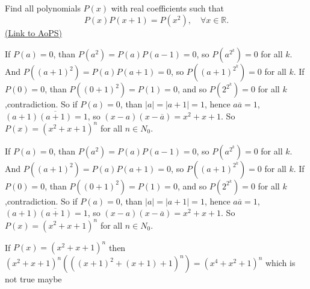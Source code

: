 \begin{problem}
	Find all polynomials $P(x)$ with real coefficients such that
\[P(x)P(x + 1) = P(x^2), \quad \forall x \in \mathbb R.\]
	\flushright \href{https://artofproblemsolving.com/community/c6h395325}{(Link to AoPS)}
\end{problem}



\begin{solution}
	If $P(a)=0$, than $P(a^2)=P(a)P(a-1)=0$, so $P(a^{2^k})=0$ for all $k$. And  $P((a+1)^2)=P(a)P(a+1)=0$, so $P((a+1)^{2^k})=0$ for all $k$.
If $P(0)=0$, than $P((0+1)^2)=P(1)=0$, and so $P(2^{2^k})=0$ for all $k$,contradiction.
So if $P(a)=0$, than $\left|a\right|=\left|a+1\right|=1$, hence $a\overline a=1$,  $(a+1)\overline {(a+1)}=1$, so $(x-a)(x-\overline a)=x^2+x+1$.
So $P(x)=(x^2+x+1)^n$ for all $n\in{N_0}$.
\end{solution}



\begin{solution}
	\begin{tcolorbox}If $P(a)=0$, than $P(a^2)=P(a)P(a-1)=0$, so $P(a^{2^k})=0$ for all $k$. And  $P((a+1)^2)=P(a)P(a+1)=0$, so $P((a+1)^{2^k})=0$ for all $k$.
If $P(0)=0$, than $P((0+1)^2)=P(1)=0$, and so $P(2^{2^k})=0$ for all $k$,contradiction.
So if $P(a)=0$, than $\left|a\right|=\left|a+1\right|=1$, hence $a\overline a=1$,  $(a+1)\overline {(a+1)}=1$, so $(x-a)(x-\overline a)=x^2+x+1$.
So $P(x)=(x^2+x+1)^n$ for all $n\in{N_0}$.\end{tcolorbox}
If $P(x)=(x^2+x+1)^n$ then $(x^2+x+1)^n(((x+1)^2+(x+1)+1)^n)=(x^4+x^2+1)^n$ which is not true maybe
\end{solution}



